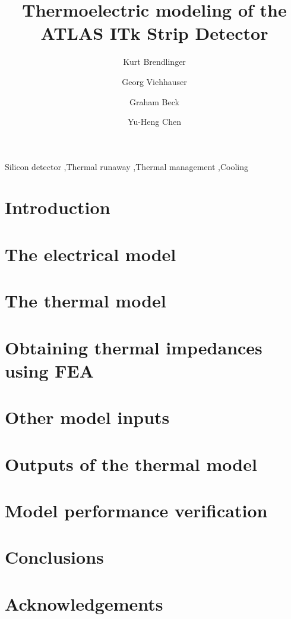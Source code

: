 \documentclass[preprint]{elsarticle/elsarticle}
\begin{document}
\begin{frontmatter}

\title{Thermoelectric modeling of the ATLAS ITk Strip Detector}
\author[1]{Kurt Brendlinger} %
\author[2]{Georg Viehhauser} %
\author[3]{Graham Beck}      %
\author[4]{Yu-Heng Chen}     %
\address{}

\begin{abstract}

\end{abstract}

\begin{keyword}
Silicon detector \sep Thermal runaway \sep Thermal management \sep Cooling
\end{keyword}

\end{frontmatter}

\section{Introduction}


\section{The electrical model}


\section{The thermal model}


\section{Obtaining thermal impedances using FEA}


\section{Other model inputs}


\section{Outputs of the thermal model}


\section{Model performance verification}

\section{Conclusions}


\section{Acknowledgements}




\end{document}
